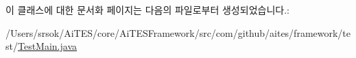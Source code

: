 이 클래스에 대한 문서화 페이지는 다음의 파일로부터 생성되었습니다.\+:\begin{DoxyCompactItemize}
\item 
/\+Users/srsok/\+Ai\+T\+E\+S/core/\+Ai\+T\+E\+S\+Framework/src/com/github/aites/framework/test/\mbox{\hyperlink{_test_main_8java}{Test\+Main.\+java}}\end{DoxyCompactItemize}
